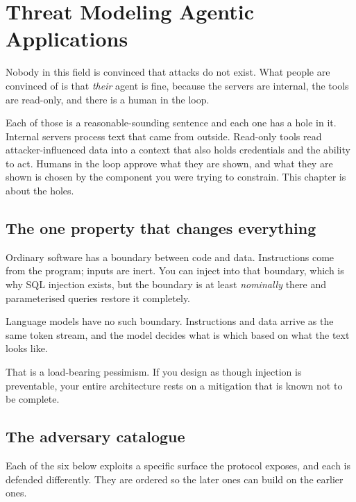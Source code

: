 \chapter{Threat Modeling Agentic Applications}
\label{ch:threats}

Nobody in this field is convinced that attacks do not exist. What people are
convinced of is that \emph{their} agent is fine, because the servers are
internal, the tools are read-only, and there is a human in the loop.

Each of those is a reasonable-sounding sentence and each one has a hole in it.
Internal servers process text that came from outside. Read-only tools read
attacker-influenced data into a context that also holds credentials and the
ability to act. Humans in the loop approve what they are shown, and what they
are shown is chosen by the component you were trying to constrain. This chapter
is about the holes.

\section{The one property that changes everything}

Ordinary software has a boundary between code and data. Instructions come from
the program; inputs are inert. You can inject into that boundary, which is why
SQL injection exists, but the boundary is at least \emph{nominally} there and
parameterised queries restore it completely.

Language models have no such boundary. Instructions and data arrive as the same
token stream, and the model decides what is which based on what the text looks
like.


That is a load-bearing pessimism. If you design as though injection is
preventable, your entire architecture rests on a mitigation that is known not to
be complete.

\section{The adversary catalogue}

Each of the six below exploits a specific surface the protocol exposes, and
each is defended differently. They are ordered so the later ones can build on
the earlier ones.

